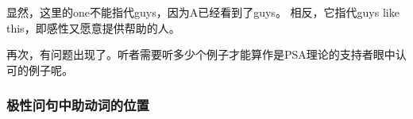 \z
显然，这里的one不能指代guys，因为A已经看到了guys。
相反，它指代guys like this，即感性又愿意提供帮助的人。

再次，有问题出现了。听者需要听多少个例子才能算作是PSA理论的支持者眼中认可的例子呢。

\subsubsection{极性问句中助动词的位置}
\label{Abschnitt-Hilfsverbumstellung}

